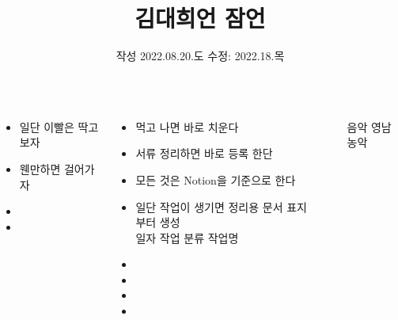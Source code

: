 \documentclass[25pt, a1paper ]{tikzposter}
\title{김대희언 잠언 }
\author{ 작성 2022.08.20.도  수정: 2022.18.목 }
\begin{document}
	\maketitle

	\begin{columns}
			{
			\setlength{\leftmargini}{2em}			
			\setlength{\labelsep}{1em} %
				\begin{LARGE}
					\begin{itemize}
					\item 일단 이빨은  딱고 보자
					\item 웬만하면 걸어가자
					\item 
					\item 
					\end{itemize}
				\end{LARGE}
			}





		{
			\setlength{\leftmargini}{3em}			
			\setlength{\labelsep}{1em} %
			\begin{LARGE}
			\begin{itemize}
			\item 먹고 나면 바로 치운다
			\item 서류 정리하면 바로 등록 한단
			\item 모든 것은 Notion을 기준으로 한다
			\item 일단 작업이 생기면 정리용 문서 표지 부터 생성\\
					일자
					작업 분류
					작업명
			\item 
			\item 
			\item 
			\item 
			\end{itemize}
			\end{LARGE}
		}		


		{
			\setlength{\leftmargini}{7em}			
			\setlength{\labelsep}{1em} %
			\begin{LARGE}
			\begin{itemize}
			\item [음악] 영남 농악
			\end{itemize}
			\end{LARGE}
		}	%





\end{columns}
\end{document}
